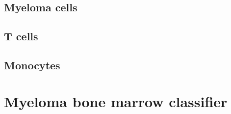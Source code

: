 \subsection{Myeloma cells}

\subsection{T cells}

\subsection{Monocytes}


\section{Myeloma bone marrow classifier}